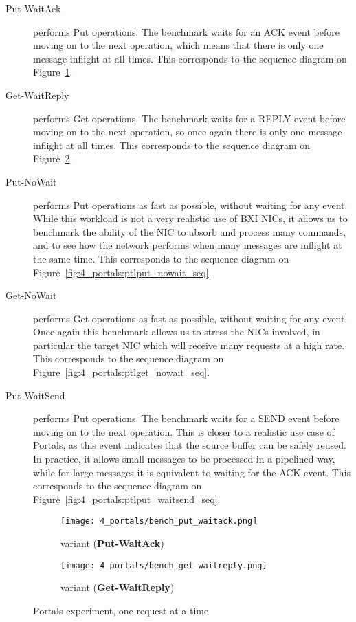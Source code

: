 \begin{description}
    \item[Put-WaitAck] performs Put operations. The benchmark waits for an ACK
    event before moving on to the next operation, which means that there is only
    one message inflight at all times. This corresponds to the sequence diagram
    on Figure~\ref{fig:4_portals:ptlput_waitack_seq}.
    \item[Get-WaitReply] performs Get operations. The benchmark waits for a
    REPLY event before moving on to the next operation, so once again there is
    only one message inflight at all times. This corresponds to the sequence
    diagram on Figure~\ref{fig:4_portals:ptlget_waitreply_seq}.
    \item[Put-NoWait] performs Put operations as fast as possible, without
    waiting for any event. While this workload is not a very realistic use of
    BXI NICs, it allows us to benchmark the ability of the NIC to absorb and
    process many commands, and to see how the network performs when many
    messages are inflight at the same time. This corresponds to the sequence
    diagram on Figure~\ref{fig:4_portals:ptlput_nowait_seq}.
    \item[Get-NoWait] performs Get operations as fast as possible, without
    waiting for any event. Once again this benchmark allows us to stress the
    NICs involved, in particular the target NIC which will receive many requests
    at a high rate. This corresponds to the sequence diagram on
    Figure~\ref{fig:4_portals:ptlget_nowait_seq}.
    \item[Put-WaitSend] performs Put operations. The benchmark waits for a SEND
    event before moving on to the next operation. This is closer to a realistic
    use case of Portals, as this event indicates that the source buffer can be
    safely reused. In practice, it allows small messages to be processed in a
    pipelined way, while for large messages it is equivalent to waiting for the
    ACK event. This corresponds to the sequence diagram on
    Figure~\ref{fig:4_portals:ptlput_waitsend_seq}.
\end{description}

\begin{figure}[!h]
    \centering
    \begin{subfigure}{.5\textwidth}
        \centering
        \texttt{[image: 4\_portals/bench\_put\_waitack.png]}
        \caption{ variant (\textbf{Put-WaitAck})}
        \label{fig:4_portals:ptlput_waitack_seq}
    \end{subfigure}%
    \begin{subfigure}{.5\textwidth}
        \centering
        \texttt{[image: 4\_portals/bench\_get\_waitreply.png]}
        \caption{ variant (\textbf{Get-WaitReply})}
        \label{fig:4_portals:ptlget_waitreply_seq}
    \end{subfigure}
    \caption{Portals experiment, one request at a time}
    \label{fig:4_portals:ptl_wait_seq}
\end{figure}

